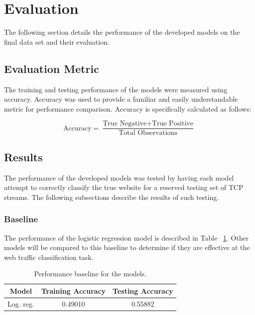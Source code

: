 \documentclass[10pt,sigconf,letterpaper,nonacm]{acmart}
\begin{document}
\section{Evaluation}

The following section details the performance of the developed models on the final data set and their evaluation.

\subsection{Evaluation Metric}

The training and testing performance of the models were measured using accuracy.
Accuracy was used to provide a familiar and easily understandable metric for performance comparison.
Accuracy is specifically calculated as follows:

\begin{equation}
  \text{Accuracy} = \frac{\text{True Negative} + \text{True Positive}}{\text{Total Observations}}
\end{equation}

\subsection{Results}

The performance of the developed models was tested by having each model attempt to correctly classify the true website for a reserved testing set of TCP streams.
The following subsections describe the results of such testing.

\subsubsection{Baseline}

The performance of the logistic regression model is described in Table ~\ref{tab:log}.
Other models will be compared to this baseline to determine if they are effective at the web traffic classification task.

\begin{table}[h]
  \caption{Performance baseline for the models.}
  \label{tab:log}
  \begin{tabular}{ccc}
    \toprule
    Model & Training Accuracy & Testing Accuracy \\
    \midrule
    Log. reg. & 0.49010 & 0.55882 \\
    \bottomrule
  \end{tabular}
\end{table}
\end{document}
